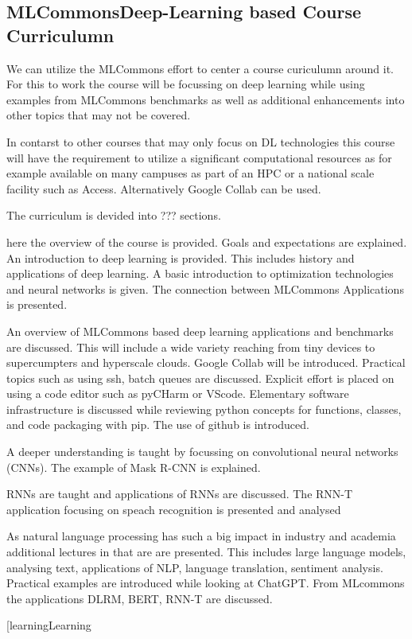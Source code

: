 \subsection{MLCommonsDeep-Learning based Course Curriculumn}

We can utilize the MLCommons effort to center a course curiculumn around it. For this to work the course will be focussing on deep learning while using examples from MLCommons benchmarks as well as additional enhancements into other topics that may not be covered.

In contarst to other courses that may only focus on DL technologies this course will have the requirement to utilize a significant computational resources as for example available on many campuses as part of an HPC or a national scale facility such as Access. Alternatively Google Collab can be used.

The curriculum is devided into ??? sections.

\begin{description}

\item[Course overview and Introduction:] here the overview of the course is provided. Goals and expectations are explained. An introduction to deep learning is provided. This includes   history and applications of deep learning. A basic introduction to optimization technologies and neural networks is given. The connection between MLCommons Applications is presented.

\item[Infrastructure and Benchamrarking:] An overview of MLCommons based deep learning applications and benchmarks are discussed. This will include a wide variety reaching from tiny devices to supercumpters and hyperscale clouds. Google Collab will be introduced. Practical topics such as using ssh, batch queues are discussed. Explicit effort is placed on using a code editor such as pyCHarm or VScode. Elementary software infrastructure is discussed while reviewing python concepts for functions, classes, and code packaging with pip. The use of github is introduced. 
  
\item[Convolutional Neural Networks:] A deeper understanding is taught by focussing on convolutional neural networks (CNNs). The example of Mask R-CNN is explained.

\item[Recurrent Neural Networks:] RNNs are taught and applications of RNNs are discussed. The RNN-T application focusing on speach recognition is presented and analysed

\item[Natural Language Processing:] As natural language processing has such a big impact in industry and academia additional lectures in that are are presented. This includes large language models, analysing text, applications of NLP, language translation, sentiment analysis.
Practical examples are introduced while looking at ChatGPT. From MLcommons the applications DLRM, BERT, RNN-T are discussed.
\item[learningLearning

 \end{description}
